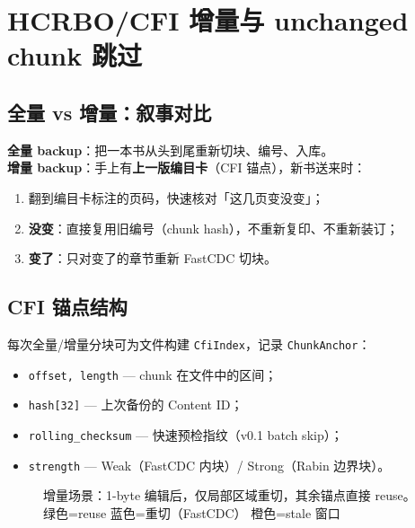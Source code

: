 \chapter{HCRBO/CFI 增量与 unchanged chunk 跳过}\label{ch:hcrbo}

\section{全量 vs 增量：叙事对比}

\begin{analogybox}[图书馆编目比喻]
\textbf{全量 backup}：把一本书从头到尾重新切块、编号、入库。\\
\textbf{增量 backup}：手上有\textbf{上一版编目卡}（CFI 锚点），新书送来时：
\begin{enumerate}[nosep]
  \item 翻到编目卡标注的页码，快速核对「这几页变没变」；
  \item \textbf{没变}：直接复用旧编号（chunk hash），不重新复印、不重新装订；
  \item \textbf{变了}：只对变了的章节重新 FastCDC 切块。
\end{enumerate}
\end{analogybox}

\section{CFI 锚点结构}

每次全量/增量分块可为文件构建 \texttt{CfiIndex}，记录 \texttt{ChunkAnchor}：
\begin{itemize}[nosep]
  \item \texttt{offset, length} — chunk 在文件中的区间；
  \item \texttt{hash[32]} — 上次备份的 Content ID；
  \item \texttt{rolling\_checksum} — 快速预检指纹（v0.1 batch skip）；
  \item \texttt{strength} — Weak（FastCDC 内块）/ Strong（Rabin 边界块）。
\end{itemize}

\begin{figure}[htbp]
\centering
{}
\caption{增量场景：1-byte 编辑后，仅局部区域重切，其余锚点直接 reuse。\\
{\footnotesize 绿色=reuse \quad 蓝色=重切（FastCDC） \quad 橙色=stale 窗口}}
\label{fig:incremental-reuse}
\end{figure}

